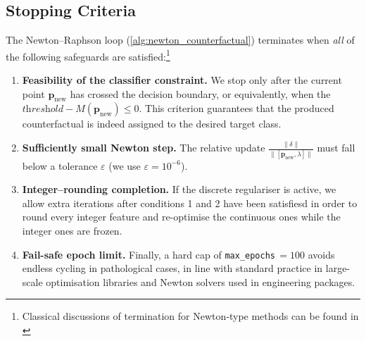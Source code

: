 \documentclass[12pt]{extarticle}
\numberwithin{equation}{section}
\begin{document}
\subsection{Stopping Criteria}\label{sec:stopping}

The Newton–Raphson loop (\autoref{alg:newton_counterfactual}) terminates when
\emph{all} of the following safeguards are satisfied:\footnote{Classical
discussions of termination for Newton‐type methods can be found in
\cite{numopt}}

\begin{enumerate}
  \item \textbf{Feasibility of the classifier constraint.}  
        We stop only after the current point $\mathbf{p}_{\text{new}}$ has crossed the decision boundary, or equivalently, when the $\textit{threshold}-M(\mathbf{p}_{\text{new}})\le 0$. This criterion guarantees that the produced counterfactual is indeed assigned to the desired target class.
  \item \textbf{Sufficiently small Newton step.}  
        The relative update $\tfrac{\lVert\delta\rVert}{\lVert[\mathbf{p}_{\text{new}},\lambda]\rVert}$ must fall below a tolerance $\varepsilon$ (we use $\varepsilon=10^{-6}$).
  \item \textbf{Integer–rounding completion.}  
        If the discrete regulariser is active, we allow extra iterations after conditions 1 and 2 have been satisfiesd in order to round every integer feature and re-optimise the continuous ones while the integer ones are frozen.
  \item \textbf{Fail-safe epoch limit.}
        Finally, a hard cap of \texttt{max\_epochs}\,$=100$ avoids endless cycling in pathological cases, in line with standard practice in large-scale optimisation libraries \cite{scipyopt} and Newton solvers used in engineering packages.
\end{enumerate}
\end{document}

